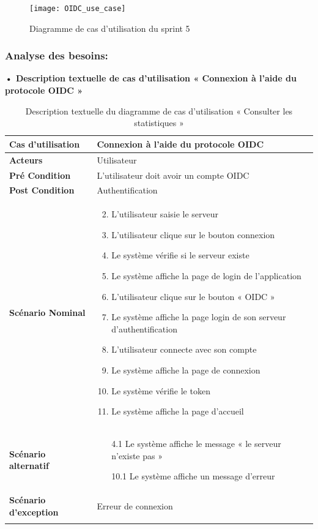 \begin{figure}[H]
  \centering
  \texttt{[image: OIDC\_use\_case]}
  \caption{Diagramme de cas d'utilisation du sprint 5}
  \label{fig:UseCaseDiagramSp51}
\end{figure}

\subsubsection{Analyse des besoins:}
\textbf{•	Description textuelle de cas d'utilisation « Connexion à l’aide du protocole OIDC  »}

\begin{longtable}{|p{5cm}|p{10cm}|}
\hline
\textbf{Cas d'utilisation}&Connexion à l’aide du protocole OIDC\\
\hline
\textbf{Acteurs}&Utilisateur\\
\hline
\textbf{Pré Condition}&L’utilisateur doit avoir un compte OIDC\\
\hline
\textbf{Post Condition}&Authentification\\
\hline
\textbf{Scénario Nominal}&
\vspace{-\baselineskip}
\begin{enumerate}
  \setcounter{enumi}{1}
    \item L’utilisateur saisie le serveur
    \item L’utilisateur clique sur le bouton connexion
    \item Le système vérifie si le serveur existe
    \item Le système affiche la page de login de l’application
    \item L'utilisateur clique sur le bouton « OIDC »
    \item Le système affiche la page login de son serveur d'authentification
    \item L’utilisateur connecte avec son compte
    \item Le système affiche la page de connexion 
    \item Le système vérifie le token
    \item Le système affiche la page d’accueil 
  
\end{enumerate}\\
\hline
\textbf{Scénario alternatif}&
\vspace{-\baselineskip}
\begin{enumerate}
  \item [4.1] Le système affiche le message « le serveur n'existe pas »
  \item [10.1] Le système affiche un message d’erreur
\end{enumerate}\\
\hline
\textbf{Scénario d'exception}&Erreur de connexion\\
\hline
\caption{Description textuelle du diagramme de cas d'utilisation « Consulter les statistiques »}
\label{tab:use_case_oidc_connect}
\end{longtable}

